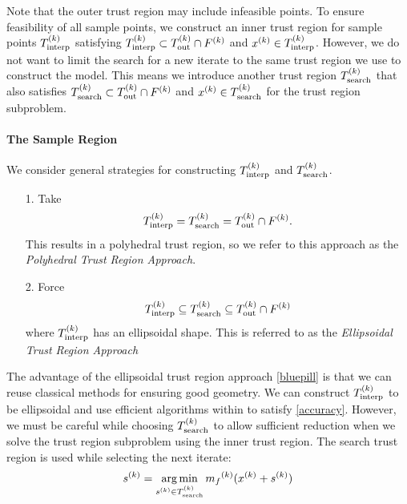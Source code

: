 Note that the outer trust region may include infeasible points.
To ensure feasibility of all sample points, we construct an inner trust region for sample points $ {T_{\text{interp}}^{(k)}} $  satisfying 
${T_{\text{interp}}^{(k)}} \subset {T_{\text{out}}^{(k)}} \cap {F}^{(k)}$ and ${x^{(k)}} \in {T_{\text{interp}}^{(k)}} $.
However, we do not want to limit the search for a new iterate to the same trust region we use to construct the model.
This means we introduce another trust region $ {T_{\text{search}}^{(k)}} $ that also satisfies $ {T_{\text{search}}^{(k)}} \subset {T_{\text{out}}^{(k)}} \cap {F}^{(k)}$ and ${x^{(k)}} \in {T_{\text{search}}^{(k)}} $ for the trust region subproblem.

\paragraph{The Sample Region}
\label{sample_region_choices}
We consider general strategies for constructing $ {T_{\text{interp}}^{(k)}} $ and $ {T_{\text{search}}^{(k)}} $.
\begin{itemize}
\item[1.] Take 
\begin{align}
\label{redpill} {T_{\text{interp}}^{(k)}} = {T_{\text{search}}^{(k)}} = {T_{\text{out}}^{(k)}} \cap {F}^{(k)}.
\end{align} This results in a polyhedral trust region, so we refer to this approach as the \emph{Polyhedral Trust Region Approach}.
\item[2.] Force 
\begin{align}\label{bluepill} {T_{\text{interp}}^{(k)}} \subseteq {T_{\text{search}}^{(k)}} \subseteq {T_{\text{out}}^{(k)}} \cap {F}^{(k)}
\end{align} where ${T_{\text{interp}}^{(k)}}$ has an ellipsoidal shape. This is referred to as the \emph{Ellipsoidal Trust Region Approach}
\end{itemize}

The advantage of the ellipsoidal trust region approach \cref{bluepill} is that we can reuse classical methods for ensuring good geometry.
We can construct ${T_{\text{interp}}^{(k)}}$ to be ellipsoidal and use efficient algorithms within \cite{DUMMY:intro_book} to satisfy \cref{accuracy}.
However, we must be careful while choosing $ {T_{\text{search}}^{(k)}}$ to allow sufficient reduction when we solve the trust region subproblem using the inner trust region.
The search trust region is used while selecting the next iterate:
\begin{align*}
{{s}^{(k)}} = \operatorname*{arg\,min}_{{{s}^{(k)}} \in {T_{\text{search}}^{(k)}}} {{m}_f}^{(k)}({x^{(k)}} + {{s}^{(k)}})
\end{align*}

